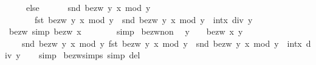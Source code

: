 \begin{isabellebody}
\ \ \ \ \ else\isanewline
\ \ \ \ \ \ {\isacharparenleft}{\kern0pt}snd\ {\isacharparenleft}{\kern0pt}bezw\ y\ {\isacharparenleft}{\kern0pt}x\ mod\ y{\isacharparenright}{\kern0pt}{\isacharparenright}{\kern0pt}{\isacharcomma}{\kern0pt}\isanewline
\ \ \ \ \ \ \ fst\ {\isacharparenleft}{\kern0pt}bezw\ y\ {\isacharparenleft}{\kern0pt}x\ mod\ y{\isacharparenright}{\kern0pt}{\isacharparenright}{\kern0pt}\ {\isacharminus}{\kern0pt}\ snd\ {\isacharparenleft}{\kern0pt}bezw\ y\ {\isacharparenleft}{\kern0pt}x\ mod\ y{\isacharparenright}{\kern0pt}{\isacharparenright}{\kern0pt}\ {\isacharasterisk}{\kern0pt}\ int{\isacharparenleft}{\kern0pt}x\ div\ y{\isacharparenright}{\kern0pt}{\isacharparenright}{\kern0pt}{\isacharparenright}{\kern0pt}{\isachardoublequoteclose}\isanewline
\isanewline
{}\isamarkupfalse%
\ bezw{\isacharunderscore}{\kern0pt}{}\ {\isacharbrackleft}{\kern0pt}simp{\isacharbrackright}{\kern0pt}{\isacharcolon}{\kern0pt}\ {\isachardoublequoteopen}bezw\ x\ {}\ {\isacharequal}{\kern0pt}\ {\isacharparenleft}{\kern0pt}{}{\isacharcomma}{\kern0pt}\ {}{\isacharparenright}{\kern0pt}{\isachardoublequoteclose}\isanewline
%
\isadelimproof
\ \ %
\endisadelimproof
%
\isatagproof
{}\isamarkupfalse%
\ simp%
\endisatagproof
{\isafoldproof}%
%
\isadelimproof
\isanewline
%
\endisadelimproof
\isanewline
{}\isamarkupfalse%
\ bezw{\isacharunderscore}{\kern0pt}non{\isacharunderscore}{\kern0pt}{}{\isacharcolon}{\kern0pt}\isanewline
\ \ {\isachardoublequoteopen}y\ {\isachargreater}{\kern0pt}\ {}\ {\isasymLongrightarrow}\ bezw\ x\ y\ {\isacharequal}{\kern0pt}\isanewline
\ \ \ \ {\isacharparenleft}{\kern0pt}snd\ {\isacharparenleft}{\kern0pt}bezw\ y\ {\isacharparenleft}{\kern0pt}x\ mod\ y{\isacharparenright}{\kern0pt}{\isacharparenright}{\kern0pt}{\isacharcomma}{\kern0pt}\ fst\ {\isacharparenleft}{\kern0pt}bezw\ y\ {\isacharparenleft}{\kern0pt}x\ mod\ y{\isacharparenright}{\kern0pt}{\isacharparenright}{\kern0pt}\ {\isacharminus}{\kern0pt}\ snd\ {\isacharparenleft}{\kern0pt}bezw\ y\ {\isacharparenleft}{\kern0pt}x\ mod\ y{\isacharparenright}{\kern0pt}{\isacharparenright}{\kern0pt}\ {\isacharasterisk}{\kern0pt}\ int{\isacharparenleft}{\kern0pt}x\ div\ y{\isacharparenright}{\kern0pt}{\isacharparenright}{\kern0pt}{\isachardoublequoteclose}\isanewline
%
\isadelimproof
\ \ %
\endisadelimproof
%
\isatagproof
{}\isamarkupfalse%
\ simp%
\endisatagproof
{\isafoldproof}%
%
\isadelimproof
\isanewline
%
\endisadelimproof
\isanewline
{}\isamarkupfalse%
\ bezw{\isachardot}{\kern0pt}simps\ {\isacharbrackleft}{\kern0pt}simp\ del{\isacharbrackright}{\kern0pt}\isanewline

\end{isabellebody}
